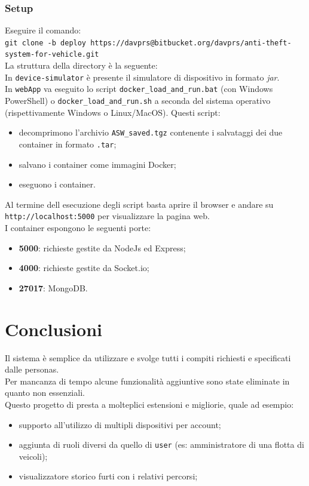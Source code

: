 \documentclass{report}
\begin{document}
\subsubsection{Setup}
Eseguire il comando:\\
\texttt{git clone -b deploy https://davprs@bitbucket.org/davprs/anti-theft-system-for-vehicle.git}\\
\newline
La struttura della directory è la seguente:\\
\hfill \break
In \texttt{device-simulator} è presente il simulatore di dispositivo in formato \textit{jar}.\\
In \texttt{webApp} va eseguito lo script \texttt{docker\_load\_and\_run.bat} (con Windows PowerShell) o \texttt{docker\_load\_and\_run.sh} a seconda del sistema operativo (rispettivamente Windows o Linux/MacOS). Questi script:
\begin{itemize}
    \item decomprimono l'archivio \texttt{ASW\_saved.tgz} contenente i salvataggi dei due container in formato \texttt{.tar};
    \item salvano i container come immagini Docker;
    \item eseguono i container.
\end{itemize}
Al termine dell esecuzione degli script basta aprire il browser e andare su \texttt{http://localhost:5000} per visualizzare la pagina web.\\
I container espongono le seguenti porte:
\begin{itemize}
    \item \textbf{5000}: richieste gestite da NodeJs ed Express;
    \item \textbf{4000}: richieste gestite da Socket.io;
    \item \textbf{27017}: MongoDB.
\end{itemize}

\section{Conclusioni}
Il sistema è semplice da utilizzare e svolge tutti i compiti richiesti e specificati dalle personas.\\ Per mancanza di tempo alcune funzionalità aggiuntive sono state eliminate in quanto non essenziali.\\Questo progetto di presta a molteplici estensioni e migliorie, quale ad esempio:
\begin{itemize}
    \item supporto all'utilizzo di multipli dispositivi per account;
    \item aggiunta di ruoli diversi da quello di \texttt{user} (es: amministratore di una flotta di veicoli);
    \item visualizzatore storico furti con i relativi percorsi;
\end{itemize}
\end{document}
